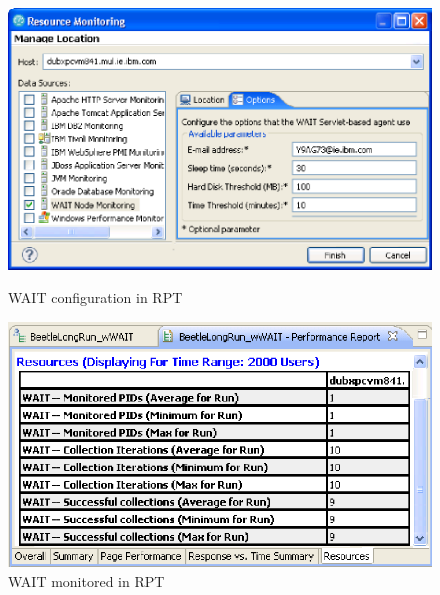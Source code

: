 \documentclass[runningheads,a4paper]{llncs}
\begin{document}
\vspace{-5pt}
\begin{figure}
\centering
\begin{minipage}[b]{.50\textwidth}

\centering
\includegraphics[totalheight=.27\textheight,width=1.0\textwidth]{WAIT-config}
\caption{WAIT configuration in RPT}
\label{fig_config}

\end{minipage}\qquad
\begin{minipage}[b]{.44\textwidth}

\centering
\includegraphics[totalheight=.27\textheight,width=1.0\textwidth]{WAIT-monitoring}
\caption{WAIT monitored in RPT}
\label{fig_mon}

\end{minipage}
\end{figure}
\vspace{-5pt}

\end{document}
